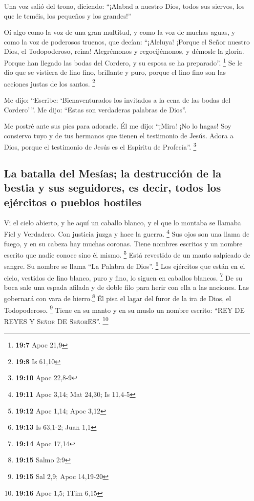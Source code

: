 \begin{paracol}{2}
 Una voz salió del trono, diciendo: ``¡Alabad a nuestro
Dios, todos sus siervos, los que le teméis, los pequeños y los
grandes!''

 Oí algo como la voz de una gran multitud, y como la voz
de muchas aguas, y como la voz de poderosos truenos, que decían:
``¡Aleluya! ¡Porque el Señor nuestro Dios, el Todopoderoso, reina!
 Alegrémonos y regocijémonos, y démosle la gloria. Porque
han llegado las bodas del Cordero, y su esposa se ha preparado''.
\footnote{\textbf{19:7} Apoc 21,9}  Se le dio que se
vistiera de lino fino, brillante y puro, porque el lino fino son las
acciones justas de los santos. \footnote{\textbf{19:8} Is 61,10}

 Me dijo: ``Escribe: `Bienaventurados los invitados a la
cena de las bodas del Cordero'\,''. Me dijo: ``Estas son verdaderas
palabras de Dios''.

 Me postré ante sus pies para adorarle. Él me dijo:
``¡Mira! ¡No lo hagas! Soy consiervo tuyo y de tus hermanos que tienen
el testimonio de Jesús. Adora a Dios, porque el testimonio de Jesús es
el Espíritu de Profecía''. \footnote{\textbf{19:10} Apoc 22,8-9}

\hypertarget{la-batalla-del-mesuxedas-la-destrucciuxf3n-de-la-bestia-y-sus-seguidores-es-decir-todos-los-ejuxe9rcitos-o-pueblos-hostiles}{%
\subsection{La batalla del Mesías; la destrucción de la bestia y sus
seguidores, es decir, todos los ejércitos o pueblos
hostiles}\label{la-batalla-del-mesuxedas-la-destrucciuxf3n-de-la-bestia-y-sus-seguidores-es-decir-todos-los-ejuxe9rcitos-o-pueblos-hostiles}}

 Vi el cielo abierto, y he aquí un caballo blanco, y el
que lo montaba se llamaba Fiel y Verdadero. Con justicia juzga y hace la
guerra. \footnote{\textbf{19:11} Apoc 3,14; Mat 24,30; Is 11,4-5}
 Sus ojos son una llama de fuego, y en su cabeza hay
muchas coronas. Tiene nombres escritos y un nombre escrito que nadie
conoce sino él mismo. \footnote{\textbf{19:12} Apoc 1,14; Apoc 3,12}
 Está revestido de un manto salpicado de sangre. Su
nombre se llama ``La Palabra de Dios''. \footnote{\textbf{19:13} Is
  63,1-2; Juan 1,1}  Los ejércitos que están en el cielo,
vestidos de lino blanco, puro y fino, lo siguen en caballos blancos.
\footnote{\textbf{19:14} Apoc 17,14}  De su boca sale una
espada afilada y de doble filo para herir con ella a las naciones. Las
gobernará con vara de hierro.\footnote{\textbf{19:15} Salmo 2:9} Él pisa
el lagar del furor de la ira de Dios, el Todopoderoso. \footnote{\textbf{19:15}
  Sal 2,9; Apoc 14,19-20}  Tiene en su manto y en su
muslo un nombre escrito: ``REY DE REYES Y \textsc{Señor} DE
\textsc{Señor}ES''. \footnote{\textbf{19:16} Apoc 1,5; 1Tim 6,15}


\end{paracol}
